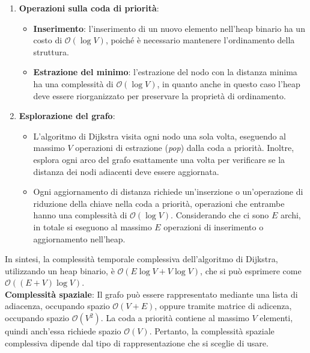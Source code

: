 \documentclass[a4paper,12pt]{article}
\begin{document}
\begin{enumerate} 
    \item \textbf{Operazioni sulla coda di priorità}: 
    \begin{itemize} 
        \item \textbf{Inserimento}: l'inserimento di un nuovo elemento 
        nell'heap binario ha un costo di $\mathcal{O}(\log V)$, poiché è 
        necessario mantenere l'ordinamento della struttura. 
        \item \textbf{Estrazione del minimo}: l'estrazione del nodo con 
        la distanza minima ha una complessità di $\mathcal{O}(\log V)$, 
        in quanto anche in questo caso l'heap deve essere riorganizzato per 
        preservare la proprietà di ordinamento. 
    \end{itemize}

    \item \textbf{Esplorazione del grafo}:
    \begin{itemize}
        \item L'algoritmo di Dijkstra visita ogni nodo una sola volta, 
        eseguendo al massimo $V$ operazioni di estrazione (\textit{pop}) dalla coda 
        a priorità. Inoltre, esplora ogni arco del grafo esattamente una volta per 
        verificare se la distanza dei nodi adiacenti deve essere aggiornata.
        \item Ogni aggiornamento di distanza richiede un'inserzione o un'operazione 
        di riduzione della chiave nella coda a priorità, operazioni che entrambe 
        hanno una complessità di $\mathcal{O}(\log V)$. Considerando che ci sono $E$ 
        archi, in totale si eseguono al massimo $E$ operazioni di inserimento o 
        aggiornamento nell'heap.
    \end{itemize}
\end{enumerate}

In sintesi, la complessità temporale complessiva dell'algoritmo di Dijkstra, 
utilizzando un heap binario, è $\mathcal{O}(E \log V + V \log V)$, che si può 
esprimere come $\mathcal{O}((E + V) \log V)$.\\

\textbf{Complessità spaziale}: Il grafo può essere rappresentato mediante una lista di 
adiacenza, occupando spazio $\mathcal{O}(V + E)$, oppure tramite matrice di adicenza, 
occupando spazio $\mathcal{O}(V^2)$. 
La coda a priorità contiene al massimo $V$ elementi, quindi anch'essa 
richiede spazio $\mathcal{O}(V)$. 
Pertanto, la complessità spaziale complessiva dipende dal tipo di rappresentazione 
che si sceglie di usare. 
\end{document}
